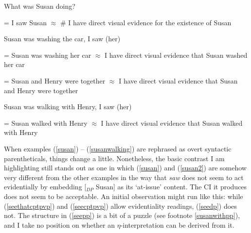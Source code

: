 \documentclass{article}
\begin{document}
\begin{exe}
\ex What was Susan doing?\label{synparenth}
\begin{xlist}
\label{susan2}
\begin{xlist}
 = I saw Susan
 $\approx$ \# I have direct visual evidence for the existence of Susan 
\end{xlist}
\ex Susan was washing the car, I saw (her)\label{susanwashing2}
\begin{xlist}
 = Susan was washing her car
 $\approx$ I have direct visual evidence that Susan washed her car 
\end{xlist}
\begin{xlist}
 = Susan and Henry were together
 $\approx$ I have direct visual evidence that Susan and Henry were together
\end{xlist}
\ex Susan was walking with Henry, I saw (her)\label{susanwalking2}
\begin{xlist}
 = Susan walked with Henry
 $\approx$ I have direct visual evidence that Susan walked with Henry
\end{xlist}
\end{xlist}
\end{exe}

When examples (\ref{susan}) -- (\ref{susanwalking}) are rephrased as overt syntactic parentheticals, things change a little. Nonetheless, the basic contrast I am highlighting still stands out as one in which (\ref{susan}) and (\ref{susan2}) are somehow very different from the other examples in the way that {\sl saw} does not seem to act evidentially by embedding [$_{DP}$ Susan] as its `at-issue' content. The CI it produces does not seem to be acceptable. An initial observation might run like this: while (\ref{seethatcptpvp}) and (\ref{seecptpvp}) allow evidentiality readings, (\ref{seedp}) does not. The structure in (\ref{seepp}) is a bit of a puzzle (see footnote \ref{susanwithpp}), and I take no position on whether an $\eta$-interpretation can be derived from it.
\end{document}
